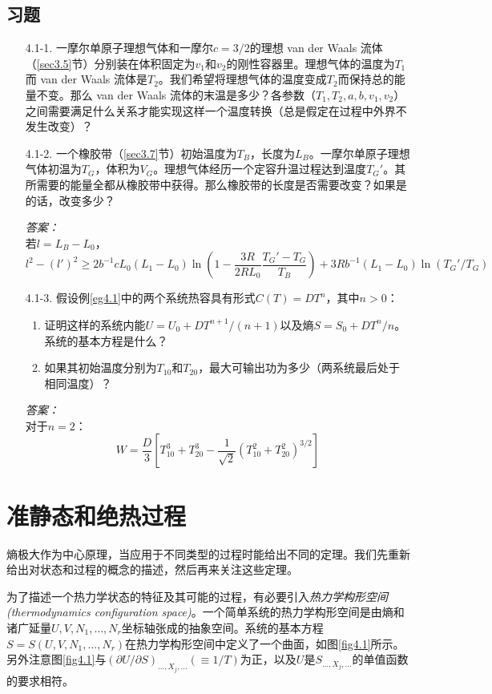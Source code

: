 \subsection*{习题}
\begin{itemize}
\item[4.1-1.] 一摩尔单原子理想气体和一摩尔$c=3/2$的理想 van der Waals 流体（\ref{sec3.5}节）分别装在体积固定为$v_1$和$v_2$的刚性容器里。理想气体的温度为$T_1$而 van der Waals 流体是$T_2$。我们希望将理想气体的温度变成$T_2$而保持总的能量不变。那么 van der Waals 流体的末温是多少？各参数（$T_1,T_2,a,b,v_1,v_2$）之间需要满足什么关系才能实现这样一个温度转换（总是假定在过程中外界不发生改变）？
\item[4.1-2.] 一个橡胶带（\ref{sec3.7}节）初始温度为$T_B$，长度为$L_{B}$。一摩尔单原子理想气体初温为$T_G$，体积为$V_G$。理想气体经历一个定容升温过程达到温度$T_G'$。其所需要的能量全都从橡胶带中获得。那么橡胶带的长度是否需要改变？如果是的话，改变多少？
\begin{flushright}
{\it 答案：}\\
若$l=L_B-L_0$，
\[
l^2-(l')^2\ge 2b^{-1}cL_0(L_1-L_0)\ln\left(1-\frac{3R}{2RL_0}\frac{T_G'-T_G}{T_B}\right)+3Rb^{-1}(L_1-L_0)\ln(T_G'/T_G)
\]
\end{flushright}
\item[4.1-3.] 假设例\ref{eg4.1}中的两个系统热容具有形式$C(T)=DT^n$，其中$n>0$：\\
\begin{enumerate}
\item 证明这样的系统内能$U=U_0+DT^{n+1}/(n+1)$以及熵$S=S_0+DT^n/n$。系统的基本方程是什么？
\item 如果其初始温度分别为$T_{10}$和$T_{20}$，最大可输出功为多少（两系统最后处于相同温度）？
\end{enumerate}
\begin{flushright}
{\it 答案：}\\
对于$n=2$：
\[
W=\frac{D}{3}\left[T_{10}^3+T_{20}^3-\frac{1}{\sqrt{2}}(T_{10}^2+T_{20}^2)^{3/2}\right]
\]
\end{flushright}
\end{itemize}

\section{准静态和绝热过程}\label{sec4.2}
熵极大作为中心原理，当应用于不同类型的过程时能给出不同的定理。我们先重新给出对状态和过程的概念的描述，然后再来关注这些定理。

为了描述一个热力学状态的特征及其可能的过程，有必要引入{\it 热力学构形空间(thermodynamics configuration space)}。一个简单系统的热力学构形空间是由熵和诸广延量$U, V, N_1,\dots ,N_r$坐标轴张成的抽象空间。系统的基本方程$S=S(U, V, N_1,\dots ,N_r)$在热力学构形空间中定义了一个曲面，如图\ref{fig4.1}所示。另外注意图\ref{fig4.1}与$(\partial U/\partial S)_{\dots , X_j,\dots}(\equiv 1/T)$为正，以及$U$是$S_{\dots , X_j,\dots}$的单值函数的要求相符。

